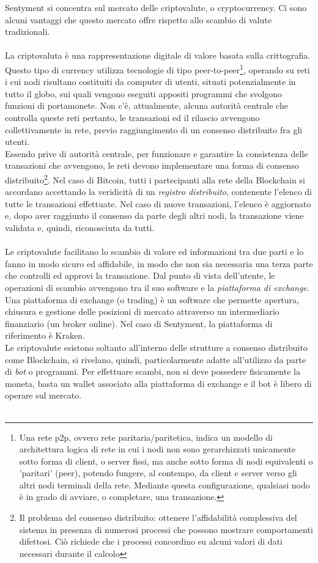 \documentclass[a4paper,12pt]{report}
\begin{document}
Sentyment si concentra sul mercato delle criptovalute, o cryptocurrency. Ci sono alcuni vantaggi che questo mercato offre rispetto allo scambio di valute tradizionali.\\~\\ La criptovaluta è una rappresentazione digitale di valore basata sulla crittografia. Questo tipo di currency utilizza tecnologie di tipo peer-to-peer\footnote{Una rete p2p, ovvero rete paritaria/paritetica, indica un modello di architettura logica di rete in cui i nodi non sono gerarchizzati unicamente sotto forma di client, o server fissi, ma anche sotto forma di nodi equivalenti o 'paritari' (peer), potendo fungere, al contempo, da client e server verso gli altri nodi terminali della rete. Mediante questa configurazione, qualsiasi nodo è in grado di avviare, o completare, una transazione.}, operando su reti i cui nodi risultano costituiti da computer di utenti, situati potenzialmente in tutto il globo, sui quali vengono eseguiti appositi programmi che svolgono funzioni di portamonete. Non c'è, attualmente, alcuna autorità centrale che controlla queste reti pertanto, le transazioni ed il rilascio avvengono collettivamente in rete, previo raggiungimento di un consenso distribuito fra gli utenti.\\ Essendo prive di autorità centrale, per funzionare e garantire la consistenza delle transazioni che avvengono, le reti devono implementare una forma di consenso distribuito\footnote{Il problema del consenso distribuito: ottenere l'affidabilità complessiva del sistema in presenza di numerosi processi che possono mostrare comportamenti difettosi. Ciò richiede che i processi concordino su alcuni valori di dati necessari durante il calcolo}. Nel caso di Bitcoin, tutti i partecipanti alla rete della Blockchain si accordano accettando la veridicità di un \textit{registro distribuito}, contenente l'elenco di tutte le transazioni effettuate. Nel caso di nuove transazioni, l'elenco è aggiornato e, dopo aver raggiunto il consenso da parte degli altri nodi, la transazione viene validata e, quindi, riconosciuta da tutti.\\~\\Le criptovalute facilitano lo scambio di valore ed informazioni tra due parti e lo fanno in modo sicuro ed affidabile, in modo che non sia necessaria una terza parte che controlli ed approvi la transazione. Dal punto di vista dell'utente, le operazioni di scambio avvengono tra il suo software e la \textit{piattaforma di exchange}. Una piattaforma di exchange (o trading) è un software che permette apertura, chiusura e gestione delle posizioni di mercato attraverso un intermediario finanziario (un broker online). Nel caso di Sentyment, la piattaforma di riferimento è Kraken.\\ Le criptovalute esistono soltanto all'interno delle strutture a consenso distribuito come Blockchain, si rivelano, quindi, particolarmente adatte all'utilizzo da parte di \textit{bot} o programmi. Per effettuare scambi, non si deve possedere fisicamente la moneta, basta un wallet associato alla piattaforma di exchange e il bot è libero di operare sul mercato.\\~\\
\end{document}

